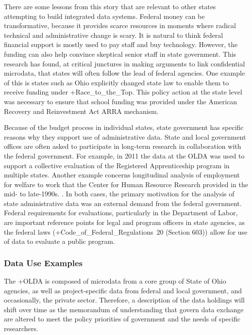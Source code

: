 \documentclass[
]{WileySix}
\begin{document}
There are some lessons from this story that are relevant to other states attempting to build integrated data systems. Federal money can be transformative, because it provides scarce resources in moments where radical technical and administrative change is scary. It is natural to think federal financial support is mostly used to pay staff and buy technology. However, the funding can also help convince skeptical senior staff in state government. This research has found, at critical junctures in making arguments to link confidential microdata, that states will often follow the lead of federal agencies. One example of this is states such as Ohio explicitly changed state law to enable them to receive funding under +Race\_to\_the\_Top\textbar. This policy action at the state level was necessary to ensure that school funding was provided under the American Recovery and Reinvestment Act ARRA mechanism.

Because of the budget process in individual states, state government has specific reasons why they support use of administrative data. State and local government offices are often asked to participate in long-term research in collaboration with the federal government. For example, in 2011 the data at the OLDA was used to support a collective evaluation of the Registered Apprenticeship program in multiple states. Another example concerns longitudinal analysis of employment for welfare to work that the Center for Human Resource Research provided in the mid- to late-1990s. \citep{centerforhumanresourceresearch2001, reed2012}. In both cases, the primary motivation for the analysis of state administrative data was an external demand from the federal government. Federal requirements for evaluations, particularly in the Department of Labor, are important reference points for legal and program officers in state agencies, as the federal laws (+Code\_of\_Federal\_Regulations\textbar~20 (Section 603)) allow for use of data to evaluate a public program.

\hypertarget{data-use-examples-1}{%
\subsubsection{Data Use Examples}\label{data-use-examples-1}}

The +OLDA\textbar{} is composed of microdata from a core group of State of Ohio agencies, as well as project-specific data from federal and local government, and occasionally, the private sector. Therefore, a description of the data holdings will shift over time as the memorandum of understanding that govern data exchange are altered to meet the policy priorities of government and the needs of specific researchers.
\end{document}
